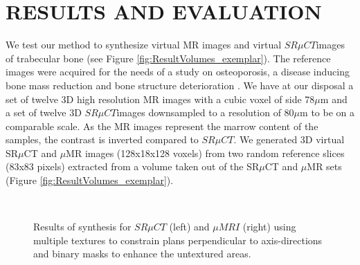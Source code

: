 \documentclass[10pt, conference]{IEEEtran}
\begin{document}
{\section{\uppercase{Results and Evaluation}}
\label{sec:ResultsAndEvaluation}
We test our method to synthesize virtual MR images and virtual $SR \mu{CT}$images of trabecular bone (see Figure \ref{fig:ResultVolumes_exemplar}). 
The reference images were acquired for the needs of a study on osteoporosis, a disease inducing bone mass 
reduction and bone structure deterioration \cite{revol2002}. 
We have at our disposal a set of twelve 3D high resolution MR images with a cubic voxel of side 78$\mu$m and a set of twelve 3D 
$SR \mu{CT}$images downsampled to a resolution of 80$\mu$m to be on a comparable scale. As the MR images represent the marrow content of the samples, 
the contrast is inverted compared to $SR \mu{CT}$.
We generated 3D virtual SR$\mu$CT and $\mu$MR images (128x18x128 voxels) from two random reference slices (83x83 pixels) 
extracted from a volume taken out of the SR$\mu$CT and $\mu$MR sets (Figure \ref{fig:ResultVolumes_exemplar}).  
 
\begin{figure}
 \vspace{-0.2cm}
 \centering
 \\
 \caption{Results of synthesis for $SR \mu{CT}$ (left) and $\mu{MRI}$ (right) using multiple textures to constrain plans perpendicular to axis-directions and binary masks to enhance the untextured areas.
         }
 \label{fig:ResultVolumes}
 \vspace{-0.1cm}
\end{figure}

}
\end{document}

